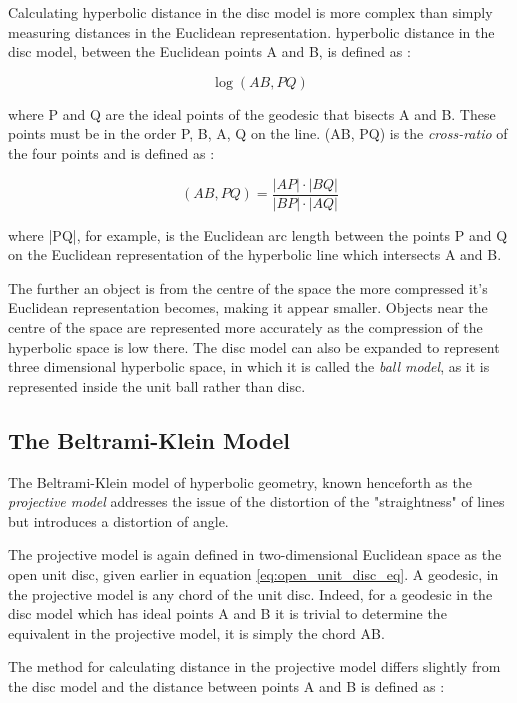 Calculating hyperbolic distance in the disc model is more complex than simply measuring distances in the Euclidean representation. hyperbolic distance in the disc model, between the Euclidean points A and B, is defined as \cite{blair_inversion_2000}:

\begin{equation}
\label{distance_disc_model}
\log(AB,PQ)
\end{equation}

where P and Q are the ideal points of the geodesic that bisects A and B. These points must be in the order P, B, A, Q on the line. (AB, PQ) is the \textit{cross-ratio} of the four points and is defined as \cite{blair_inversion_2000}:

\begin{equation}
\label{cross_ratio}
(AB,PQ) = \frac{|AP|\cdot|BQ|}{|BP|\cdot|AQ|}
\end{equation}

where |PQ|, for example, is the Euclidean arc length between the points P and Q on the Euclidean representation of the hyperbolic line which intersects A and B.

The further an object is from the centre of the space the more compressed it's Euclidean representation becomes, making it appear smaller. Objects near the centre of the space are represented more accurately as the compression of the hyperbolic space is low there. The disc model can also be expanded to represent three dimensional hyperbolic space, in which it is called the \textit{ball model}, as it is represented inside the unit ball rather than disc.

\subsection{The Beltrami-Klein Model}

The Beltrami-Klein model of hyperbolic geometry, known henceforth as the \textit{projective model} addresses the issue of the distortion of the "straightness" of lines but introduces a distortion of angle.

The projective model is again defined in two-dimensional Euclidean space as the open unit disc, given earlier in equation \ref{eq:open_unit_disc_eq}. A geodesic, in the projective model is any chord of the unit disc. Indeed, for a geodesic in the disc model which has ideal points A and B it is trivial to determine the equivalent in the projective model, it is simply the chord AB.

The method for calculating distance in the projective model differs slightly from the disc model and the distance between points A and B is defined as \cite{milnor_hyperbolic_1982}:

